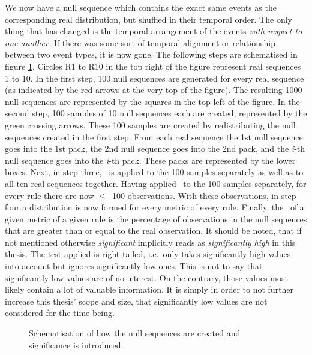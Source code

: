 We now have a null sequence which contains the exact same events as the corresponding real distribution, but shuffled in their temporal order.
The only thing that has changed is the temporal arrangement of the events \emph{with respect to one another.}
If there was some sort of temporal alignment or relationship between two event types, it is now gone.
The following steps are schematised in figure \ref{fig:sig}.
Circles R1 to R10 in the top right of the figure represent real sequences 1 to 10.
In the first step, 100 null sequences are generated for every real sequence (as indicated by the red arrows at the very top of the figure).
The resulting 1000 null sequences are represented by the squares in the top left of the figure.
In the second step, 100 samples of 10 null sequences each are created, represented by the green crossing arrows.
These 100 samples are created by redistributing the null sequences created in the first step.
From each real sequence the 1st null sequence goes into the 1st pack, the 2nd null sequence goes into the 2nd pack, and the \emph{i}-th null sequence goes into the \emph{i}-th pack.
These packs are represented by the lower boxes.
Next, in step three, \fpmlower\ is applied to the 100 samples separately as well as to all ten real sequences together.
Having applied \fpmlower\ to the 100 samples separately, for every rule there are now \(\leq\)~100 observations.
With these observations, in step four a distribution is now formed for every metric of every rule.
Finally, the \pv\ of a given metric of a given rule is the percentage of observations in the null sequences that are greater than or equal to the real observation.
It should be noted, that if not mentioned otherwise \emph{significant} implicitly reads as \emph{significantly high} in this thesis.
The test applied is right-tailed, i.e.~only takes significantly high values into account but ignores significantly low ones.
This is not to say that significantly low values are of no interest.
On the contrary, those values most likely contain a lot of valuable information.
It is simply in order to not further increase this thesis' scope and size, that significantly low values are not considered for the time being.

\begin{figure}
	\centering
	
	\caption[Introducing significance.]{Schematisation of how the null sequences are created and significance is introduced.}
	\label{fig:sig}
\end{figure}

